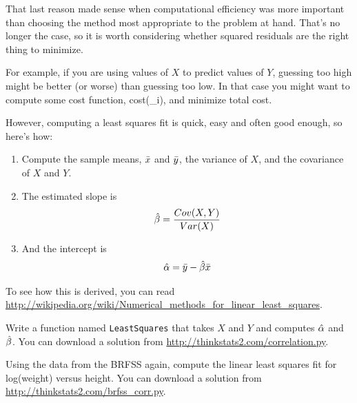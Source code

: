 \documentclass[12pt]{book}
\begin{document}
That last reason made sense when computational efficiency was more
important than choosing the method most appropriate to the problem
at hand.  That's no longer the case, so it is worth considering
whether squared residuals are the right thing to minimize.

For example, if you are using values of $X$ to predict values of $Y$,
guessing too high might be better (or worse) than guessing too low.
In that case you might want to compute some cost function,
cost(\_i), and minimize total cost.

However, computing a least squares fit is quick, easy and often good
enough, so here's how:

\begin{enumerate}

\item Compute the sample means, $\bar{x}$ and $\bar{y}$, the variance
of $X$, and the covariance of $X$ and $Y$.

\item The estimated slope is
%
\[ \hat{\beta} = \frac{Cov(X,Y)}{Var(X)} \]
%
\item And the intercept is
%
\[ \hat{\alpha} = \bar{y} - \hat{\beta} \bar{x} \]
%
\end{enumerate}

To see how this is derived, you can read
\url{http://wikipedia.org/wiki/Numerical_methods_for_linear_least_squares}.


\begin{exercise}
Write a function named {\tt LeastSquares} that takes $X$ and $Y$ and
computes $\hat{\alpha}$ and $\hat{\beta}$.  You can download a
solution from \url{http://thinkstats2.com/correlation.py}.  

\end{exercise}

\begin{exercise}
Using the data from the BRFSS again, compute the linear least squares
fit for log(weight) versus height.  You can download a
solution from \url{http://thinkstats2.com/brfss_corr.py}.

\end{exercise}
\end{document}
